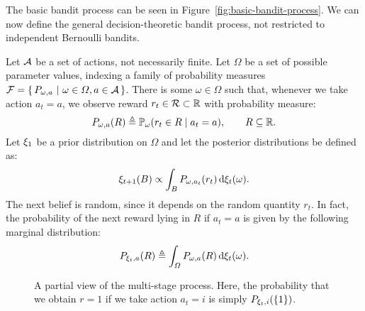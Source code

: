 The basic bandit process can be seen in Figure~\ref{fig:basic-bandit-process}. We can now define the general decision-theoretic bandit process, not restricted to independent Bernoulli bandits.
\begin{definition}
  Let ${\mathcal{A}}$ be a set of actions, not necessarily finite. Let $\Omega$ be a set of possible parameter values, indexing a family of probability measures $\mathcal{F} = \left\{\, P_{\omega, a} ~\middle|~ \omega \in \Omega, a \in {\mathcal{A}} \,\right\}$. There is some $\omega \in \Omega$ such that, whenever we take action $a_t = a$, we observe reward $r_t \in {\mathcal{R}} \subset {\mathbb{R}}$ with probability measure:
  \begin{equation}
    \label{eq:bandit-reward-probability}
    P_{\omega,a}(R) \mathrel{\triangleq} \mathop{\mbox{\ensuremath{\mathbb{P}}}}\nolimits_\omega(r_{t} \in R \mid a_t = a),
    \qquad R \subseteq {\mathbb{R}}.
  \end{equation}
  Let $\xi_1$ be a prior distribution on $\Omega$ and let the posterior distributions be defined as:
  \begin{equation}
    \label{eq:bandit-posteriors}
    \xi_{t+1}(B) \propto \int_B P_{\omega, a_t} (r_t) \,\mathrm{d} \xi_t(\omega).
  \end{equation}
  The next belief is random, since it depends on the random quantity $r_t$. In fact, the probability of the next reward lying in $R$ if $a_t = a$ is given by the following marginal distribution:
  \begin{equation}
    \label{eq:dt-bandit-reward-probability}
    P_{\xi_t, a} (R) \mathrel{\triangleq} \int_\Omega P_{\omega,a}(R) \,\mathrm{d}{\xi_t}(\omega).
  \end{equation}
  \begin{figure}[ht]
  \begin{center}
  \end{center}
  \caption{A partial view of the multi-stage process. Here, the probability that we obtain $r=1$ if we take action $a_t = i$ is simply $P_{\xi_t,i}(\{1\})$.}
  \label{fig:multi-stage-bandit}
\end{figure}  


\end{definition}
